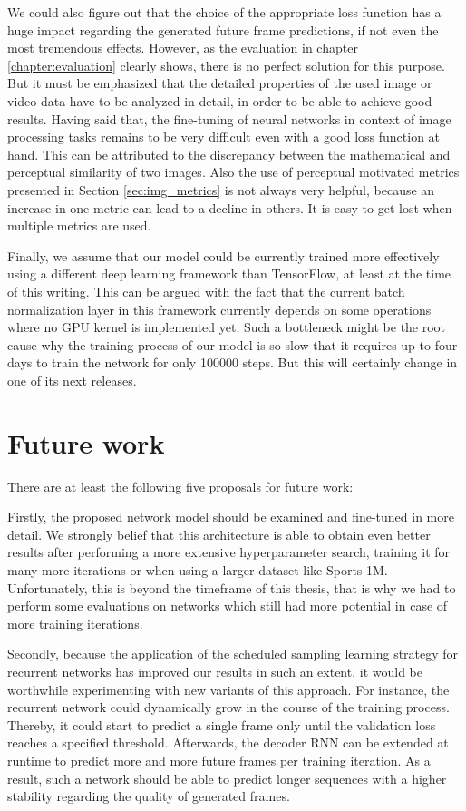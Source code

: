 We could also figure out that the choice of the appropriate loss function has a huge impact regarding the generated future frame predictions, if not even the most tremendous effects. However, as the evaluation in chapter \ref{chapter:evaluation} clearly shows, there is no perfect solution for this purpose. But it must be emphasized that the detailed properties of the used image or video data have to be analyzed in detail, in order to be able to achieve good results. Having said that, the fine-tuning of neural networks in context of image processing tasks remains to be very difficult even with a good loss function at hand. This can be attributed to the discrepancy between the mathematical and perceptual similarity of two images. Also the use of perceptual motivated metrics presented in Section \ref{sec:img_metrics} is not always very helpful, because an increase in one metric can lead to a decline in others. It is easy to get lost when multiple metrics are used.

Finally, we assume that our model could be currently trained more effectively using a different deep learning framework than TensorFlow, at least at the time of this writing. This can be argued with the fact that the current batch normalization layer in this framework currently depends on some operations where no GPU kernel is implemented yet. Such a bottleneck might be the root cause why the training process of our model is so slow that it requires up to four days to train the network for only \num{100000} steps. But this will certainly change in one of its next releases.


\section{Future work}

There are at least the following five proposals for future work:

Firstly, the proposed network model should be examined and fine-tuned in more detail. We strongly belief that this architecture is able to obtain even better results after performing a more extensive hyperparameter search, training it for many more iterations or when using a larger dataset like Sports-1M. Unfortunately, this is beyond the timeframe of this thesis, that is why we had to perform some evaluations on networks which still had more potential in case of more training iterations.

Secondly, because the application of the scheduled sampling learning strategy for recurrent networks has improved our results in such an extent, it would be worthwhile experimenting with new variants of this approach. For instance, the recurrent network could dynamically grow in the course of the training process. Thereby, it could start to predict a single frame only until the validation loss reaches a specified threshold. Afterwards, the decoder RNN can be extended at runtime to predict more and more future frames per training iteration. As a result, such a network should be able to predict longer sequences with a higher stability regarding the quality of generated frames. 

